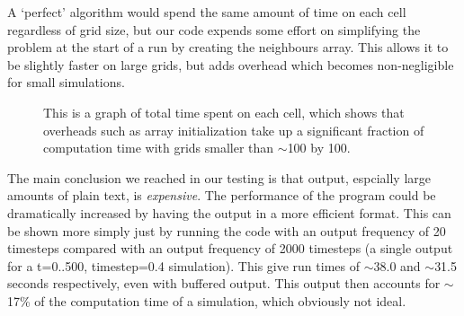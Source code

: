 	 A `perfect' algorithm would spend the same amount of time on each cell regardless of grid size, but our code expends some effort on simplifying the problem 
	 at the start of a run by creating the neighbours array. This allows it to be slightly faster on large grids, but adds overhead which becomes non-negligible 
	 for small simulations.\newline{}
	 
  \begin{figure}[h]
  
  \caption{\label{overhead}This is a graph of total time spent on each cell, which shows that overheads such as array initialization
  take up a significant fraction of computation time with grids smaller than $\sim$100 by 100.}
  \end{figure}
	 
   The main conclusion we reached in our testing is that output, espcially large amounts of plain text, is \emph{expensive}. The performance of
   the program could be dramatically increased by having the output in a more efficient format. This can be shown more simply just by running the 
   code with an output frequency of 20 timesteps compared with an output frequency of 2000 timesteps (a single output for a t=0..500, timestep=0.4
   simulation). This give run times of $\sim$38.0 and $\sim$31.5 seconds respectively, even with buffered output. This output then accounts for 
   $\sim$ 17\% of the computation time of a simulation, which obviously not ideal.  \newline{}

